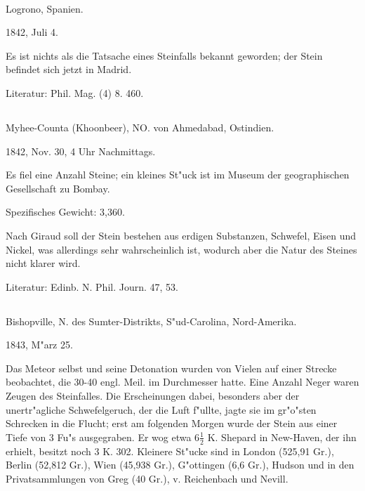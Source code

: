 \documentclass[a4paper, 11pt, oneside]{article}
\begin{document}
\paragraph{}
Logrono, Spanien.

1842, Juli 4.

Es ist nichts als die Tatsache eines Steinfalls bekannt geworden; der Stein befindet sich jetzt in Madrid.

\normalsize
Literatur: Phil. Mag. (4) 8. 460.

\subsection{}
\LARGE
\paragraph{}
Myhee-Counta (Khoonbeer), NO. von Ahmedabad, Ostindien.

1842, Nov. 30, 4 Uhr Nachmittags.

Es fiel eine Anzahl Steine; ein kleines St"uck ist im Museum der geographischen Gesellschaft zu Bombay.

Spezifisches Gewicht: 3,360.

Nach Giraud soll der Stein bestehen aus erdigen Substanzen, Schwefel, Eisen und Nickel, was allerdings sehr wahrscheinlich ist, wodurch aber die Natur des Steines nicht klarer wird.

\normalsize
Literatur: Edinb. N. Phil. Journ. 47, 53.

\subsection{}
\LARGE
\paragraph{}
Bishopville, N. des Sumter-Distrikts, S"ud-Carolina, Nord-Amerika.

1843, M"arz 25.

Das Meteor selbst und seine Detonation wurden von Vielen auf einer Strecke beobachtet, die 30-40 engl. Meil. im Durchmesser hatte. Eine Anzahl Neger waren Zeugen des Steinfalles. Die Erscheinungen dabei, besonders aber der unertr"agliche Schwefelgeruch, der die Luft f"ullte, jagte sie im gr"o"sten Schrecken in die Flucht; erst am folgenden Morgen wurde der Stein aus einer Tiefe von 3 Fu"s ausgegraben. Er wog etwa $\mathfrak{6\frac{1}{2}}$ K. Shepard in New-Haven, der ihn erhielt, besitzt noch 3 K. 302. Kleinere St"ucke sind in London (525,91 Gr.), Berlin (52,812 Gr.), Wien (45,938 Gr.), G"ottingen (6,6 Gr.), Hudson und in den Privatsammlungen von Greg (40 Gr.), v. Reichenbach und Nevill.
\end{document}
